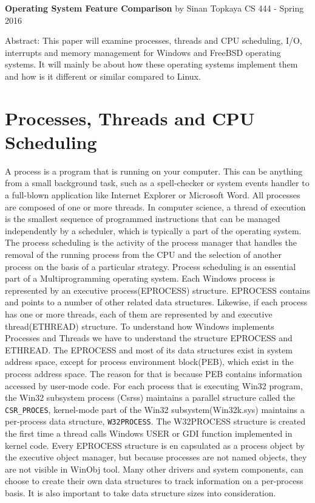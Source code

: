 \documentclass[letterpaper,10pt,draftclsnofoot,onecolumn]{IEEEtran}
\begin{document}
	\begin{titlepage}
		
		\begin{center}
		\bigbreak	
		\textbf{Operating System Feature Comparison}
		\bigbreak
		by Sinan Topkaya
		\smallbreak
		CS 444 - Spring 2016
		\end{center}
		\vfill
		
		Abstract: This paper will examine processes, threads and CPU scheduling, I/O, interrupts and memory management for Windows and FreeBSD operating systems. It will mainly be about how these operating systems implement them and how is it different or similar compared to Linux. 
		
	\end{titlepage}

\section*{Processes, Threads and CPU Scheduling}
A process is a program that is running on your computer. This can be anything from a small background task, such as a spell-checker or system events handler to a full-blown application like Internet Explorer or Microsoft Word. All processes are composed of one or more threads. In computer science, a thread of execution is the smallest sequence of programmed instructions that can be managed independently by a scheduler, which is typically a part of the operating system. The process scheduling is the activity of the process manager that handles the removal of the running process from the CPU and the selection of another process on the basis of a particular strategy. Process scheduling is an essential part of a Multiprogramming operating system.
Each Windows process is represented by an executive process(EPROCESS) structure. EPROCESS contains and points to a number of other related data structures. Likewise, if each process has one or more threads, each of them are represented by and executive thread(ETHREAD) structure. To understand how Windows implements Processes and Threads we have to understand the structure EPROCESS and ETHREAD. 
The EPROCESS and most of its data structures exist in system address space, except for process environment block(PEB), which exist in the process address space. The reason for that is because PEB contains information accessed by user-mode code. For each process that is executing Win32 program, the Win32 subsystem process (Csrss) maintains a parallel structure called the \verb|CSR_PROCES|, kernel-mode part of the Win32 subsystem(Win32k.sys) maintains a per-process data structure, \verb|W32PROCESS|. The W32PROCESS structure is created the first time a thread calls Windows USER or GDI function implemented in kernel code. Every EPROCESS structure is en capsulated as a process object by the executive object manager, but because processes are not named objects, they are not visible in WinObj tool. Many other drivers and system components, can choose to create their own data structures to track information on a per-process basis. It is also important to take data structure sizes into consideration.\cite{[1]}
\end{document}

